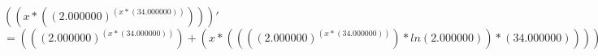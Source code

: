 \documentclass[a4paper, 12 pt]{article}
\begin{document}
	$\left((x*(\left(2.000000\right)^{(x*\left(34.000000\right))}))\right)'$
	$= ((\left(2.000000\right)^{(x*\left(34.000000\right))})+(x*(((\left(2.000000\right)^{(x*\left(34.000000\right))})*ln{\left(2.000000\right)})*\left(34.000000\right))))$
\end{document}
